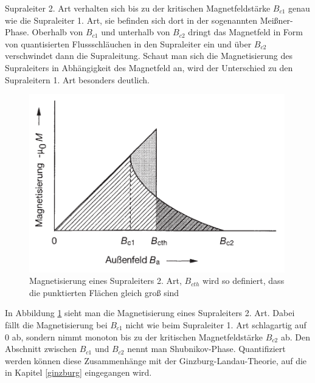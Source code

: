 Supraleiter 2. Art verhalten sich bis zu der kritischen Magnetfeldstärke $B_{c1}$ genau wie die Supraleiter 1. Art, sie befinden sich dort in der sogenannten Meißner-Phase. Oberhalb von $B_{c1}$ und unterhalb von $B_{c2}$ dringt das Magnetfeld in Form von quantisierten Flussschläuchen in den Supraleiter ein und über $B_{c2}$ verschwindet dann die Supraleitung. Schaut man sich die Magnetisierung des Supraleiters in Abhängigkeit des Magnetfeld an, wird der Unterschied zu den Supraleitern 1. Art besonders deutlich.
\begin{figure}[htbp]  
     \includegraphics[width=0.99\textwidth]{2_art.png}
  \caption{Magnetisierung eines Supraleiters 2. Art, $B_{cth}$ wird so definiert, dass die punktierten Flächen gleich groß sind \cite{supraleitung}}
  \label{2.art}
\end{figure}
In Abbildung \ref{2.art} sieht man die Magnetisierung eines Supraleiters 2. Art. Dabei fällt die Magnetisierung bei $B_{c1}$ nicht wie beim Supraleiter 1. Art schlagartig auf $0$ ab, sondern nimmt monoton bis zu der kritischen Magnetfeldstärke $B_{c2}$ ab. Den Abschnitt zwischen $B_{c1}$ und $B_{c2}$ nennt man Shubnikov-Phase. Quantifiziert werden können diese Zusammenhänge mit der Ginzburg-Landau-Theorie, auf die in Kapitel \ref{ginzburg} eingegangen wird. 

